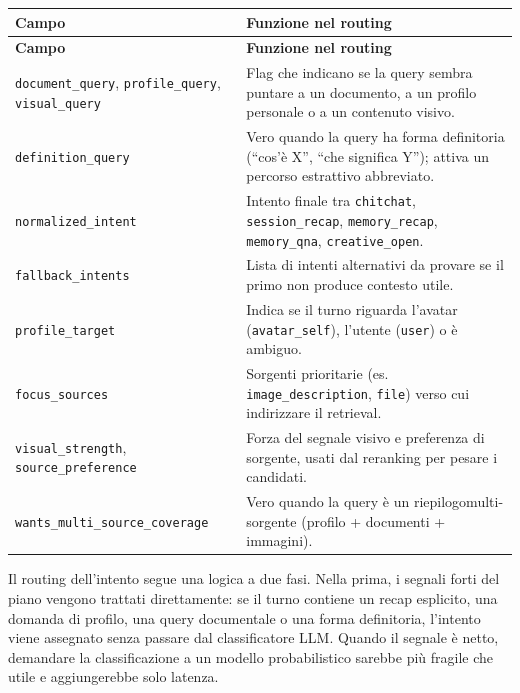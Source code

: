 \par\begingroup
\scriptsize
\setlength{\LTleft}{0pt}
\setlength{\LTright}{0pt}
\captionsetup{type=table}
\label{tab:appendix-rag-query-plan}
\begin{longtable}{|>{\raggedright\arraybackslash}p{}|>{\raggedright\arraybackslash}p{}|}
\hline
\textbf{Campo} & \textbf{Funzione nel routing} \\
\hline
\endfirsthead
\hline
\textbf{Campo} & \textbf{Funzione nel routing} \\
\hline
\endhead
\texttt{document\_query}, \texttt{profile\_query}, \texttt{visual\_query} & Flag che indicano se la query sembra puntare a un documento, a un profilo personale o a un contenuto visivo. \\
\hline
\texttt{definition\_query} & Vero quando la query ha forma definitoria (``cos'è X'', ``che significa Y''); attiva un percorso estrattivo abbreviato. \\
\hline
\texttt{normalized\_intent} & Intento finale tra \texttt{chitchat}, \texttt{session\_recap}, \texttt{memory\_recap}, \texttt{memory\_qna}, \texttt{creative\_open}. \\
\hline
\texttt{fallback\_intents} & Lista di intenti alternativi da provare se il primo non produce contesto utile. \\
\hline
\texttt{profile\_target} & Indica se il turno riguarda l'avatar (\texttt{avatar\_self}), l'utente (\texttt{user}) o è ambiguo. \\
\hline
\texttt{focus\_sources} & Sorgenti prioritarie (es. \texttt{image\_description}, \texttt{file}) verso cui indirizzare il retrieval. \\
\hline
\texttt{visual\_strength}, \texttt{source\_preference} & Forza del segnale visivo e preferenza di sorgente, usati dal reranking per pesare i candidati. \\
\hline
\texttt{wants\_multi\_source\_coverage} & Vero quando la query è un riepilogo\allowbreak multi-sorgente (profilo + documenti + immagini). \\
\hline
\end{longtable}
\par\endgroup

Il routing dell'intento segue una logica a due fasi. Nella prima, i segnali forti del piano vengono trattati direttamente: se il turno contiene un recap esplicito, una domanda di profilo, una query documentale o una forma definitoria, l'intento viene assegnato senza passare dal classificatore LLM. Quando il segnale è netto, demandare la classificazione a un modello probabilistico sarebbe più fragile che utile e aggiungerebbe solo latenza.


